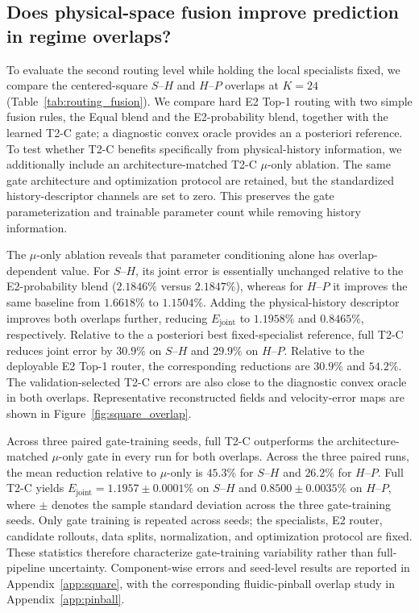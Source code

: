 \subsection{Does physical-space fusion improve prediction in regime overlaps?}
To evaluate the second routing level while holding the local specialists fixed, we compare the centered-square $S$--$H$ and $H$--$P$ overlaps at $K=24$ (Table~\ref{tab:routing_fusion}). We compare hard E2 Top-1 routing with two simple fusion rules, the Equal blend and the E2-probability blend, together with the learned T2-C gate; a diagnostic convex oracle provides an a posteriori reference. To test whether T2-C benefits specifically from physical-history information, we additionally include an architecture-matched T2-C $\mu$-only ablation. The same gate architecture and optimization protocol are retained, but the standardized history-descriptor channels are set to zero. This preserves the gate parameterization and trainable parameter count while removing history information.


The $\mu$-only ablation reveals that parameter conditioning alone has overlap-dependent value. For $S$--$H$, its joint error is essentially unchanged relative to the E2-probability blend ($2.1846\%$ versus $2.1847\%$), whereas for $H$--$P$ it improves the same baseline from $1.6618\%$ to $1.1504\%$. Adding the physical-history descriptor improves both overlaps further, reducing $E_{\mathrm{joint}}$ to $1.1958\%$ and $0.8465\%$, respectively. Relative to the a posteriori best fixed-specialist reference, full T2-C reduces joint error by $30.9\%$ on $S$--$H$ and $29.9\%$ on $H$--$P$. Relative to the deployable E2 Top-1 router, the corresponding reductions are $30.9\%$ and $54.2\%$. The validation-selected T2-C errors are also close to the diagnostic convex oracle in both overlaps. Representative reconstructed fields and velocity-error maps are shown in Figure~\ref{fig:square_overlap}.

Across three paired gate-training seeds, full T2-C outperforms the architecture-matched $\mu$-only gate in every run for both overlaps.
Across the three paired runs, the mean reduction relative to $\mu$-only is $45.3\%$ for $S$--$H$ and $26.2\%$ for $H$--$P$. Full T2-C yields
$E_{\mathrm{joint}}=1.1957\pm0.0001\%$ on $S$--$H$ and $0.8500\pm0.0035\%$ on $H$--$P$, where $\pm$ denotes the sample standard
deviation across the three gate-training seeds. Only gate training is repeated across seeds; the specialists, E2 router, candidate rollouts, data splits, normalization, and optimization protocol are fixed. These statistics therefore characterize gate-training variability rather than full-pipeline uncertainty. Component-wise errors and seed-level results are reported in Appendix~\ref{app:square}, with the corresponding fluidic-pinball overlap study in Appendix~\ref{app:pinball}.


